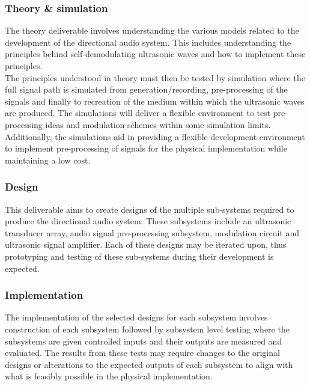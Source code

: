\subsubsection{Theory \& simulation}
The theory deliverable involves understanding the various models related to the development of the directional audio system. This includes understanding the principles behind self-demodulating ultrasonic waves and how to implement these principles.\\
The principles understood in theory must then be tested by simulation where the full signal path is simulated from generation/recording, pre-processing of the signals and finally to recreation of the medium within which the ultrasonic waves are produced. The simulations will deliver a flexible environment to test pre-processing ideas and modulation schemes within some simulation limits. Additionally, the simulations aid in providing a flexible development environment to implement pre-processing of signals for the physical implementation while maintaining a low cost.
\subsubsection{Design}
This deliverable aims to create designs of the multiple sub-systems required to produce the directional audio system. These subsystems include an ultrasonic transducer array, audio signal pre-processing subsystem, modulation circuit and ultrasonic signal amplifier. Each of these designs may be iterated upon, thus prototyping and testing of these sub-systems during their development is expected.
\subsubsection{Implementation}
The implementation of the selected designs for each subsystem involves construction of each subsystem followed by subsystem level testing where the subsystems are given controlled inputs and their outputs are measured and evaluated. The results from these tests may require changes to the original designs or alterations to the expected outputs of each subsystem to align with what is feasibly possible in the physical implementation.
\newpage
